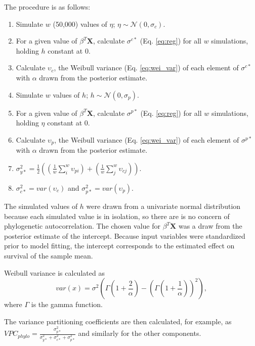 \documentclass{article}
\begin{document}
The procedure is as follows:
\begin{enumerate}
  \item Simulate \(w\) (50,000) values of \(\eta\); \(\eta \sim \mathcal{N}(0, \sigma_{c})\).
  \item For a given value of \(\beta^{T} \mathbf{X}\), calculate \(\sigma^{c*}\) (Eq. \ref{eq:reg}) for all \(w\) simulations, holding \(h\) constant at 0.
  \item Calculate \(\upsilon_{c}\), the Weibull variance (Eq. \ref{eq:wei_var}) of each element of \(\sigma^{c*}\) with \(\alpha\) drawn from the posterior estimate.
  \item Simulate \(w\) values of \(h\); \(h \sim \mathcal{N}(0, \sigma_{p})\). 
  \item For a given value of \(\beta^{T} \mathbf{X}\), calculate \(\sigma^{p*}\) (Eq. \ref{eq:reg}) for all \(w\) simulations, holding \(\eta\) constant at 0.
  \item Calculate \(\upsilon_{p}\), the Weibull variance (Eq. \ref{eq:wei_var}) of each element of \(\sigma^{p*}\) with \(\alpha\) drawn from the posterior estimate.
  \item \(\sigma_{y*}^{2} = \frac{1}{2} \left(\left(\frac{1}{w} \sum_{i}^{w} \upsilon_{pi}\right) + \left(\frac{1}{w} \sum_{j}^{w} \upsilon_{cj}\right)\right)\).
  \item \(\sigma_{c*}^{2} = var(\upsilon_{c})\) and \(\sigma_{p*}^{2} = var(\upsilon_{p})\).
\end{enumerate}

The simulated values of \(h\) were drawn from a univariate normal distribution because each simulated value is in isolation, so there are is no concern of phylogenetic autocorrelation. The chosen value for \(\beta^{T} \mathbf{X}\) was a draw from the posterior estimate of the intercept. Because input variables were standardized prior to model fitting, the intercept corresponds to the estimated effect on survival of the sample mean.

Weibull variance is calculated as
\begin{equation}
  var(x) = \sigma^{2}\left(\Gamma\left(1 + \frac{2}{\alpha}\right) - \left(\Gamma\left(1 + \frac{1}{\alpha}\right)\right)^{2}\right),
  \label{eq:wei_var}
\end{equation}
where \(\Gamma\) is the gamma function. 

The variance partitioning coefficients are then calculated, for example, as \(VPC_{phylo} = \frac{\sigma_{p*}^{2}}{\sigma_{y*}^{2} + \sigma_{c*}^{2} + \sigma_{p*}^{2}}\) and similarly for the other components.
\end{document}
